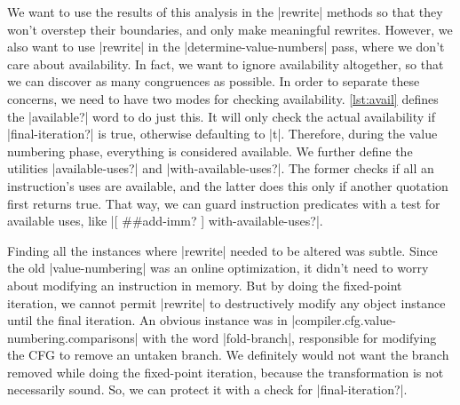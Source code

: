 We want to use the results of this analysis in the \factor|rewrite| methods so
that they won't overstep their boundaries, and only make meaningful rewrites.
However, we also want to use \factor|rewrite| in the
\factor|determine-value-numbers| pass, where we don't care about availability.
In fact, we want to ignore availability altogether, so that we can discover as
many congruences as possible.  In order to separate these concerns, we need to
have two modes for checking availability.  \vref{lst:avail} defines the
\factor|available?| word to do just this.  It will only check the actual
availability if \factor|final-iteration?| is true, otherwise defaulting to
\factor|t|.  Therefore, during the value numbering phase, everything is
considered available.  We further define the utilities \factor|available-uses?|
and \factor|with-available-uses?|.  The former checks if all an instruction's
uses are available, and the latter does this only if another quotation first
returns true.  That way, we can guard instruction predicates with a test for
available uses, like
%
\factor|[ ##add-imm? ] with-available-uses?|.


Finding all the instances where \factor|rewrite| needed to be altered was
subtle.  Since the old \factor|value-numbering| was an online optimization, it
didn't need to worry about modifying an instruction in memory.  But by doing
the fixed-point iteration, we cannot permit \factor|rewrite| to destructively
modify any object instance until the final iteration.  An obvious instance was
in \factor|compiler.cfg.value-numbering.comparisons| with the word
\factor|fold-branch|, responsible for modifying the \gls{CFG} to remove an
untaken branch.  We definitely would not want the branch removed while doing
the fixed-point iteration, because the transformation is not necessarily sound.
So, we can protect it with a check for \factor|final-iteration?|.


